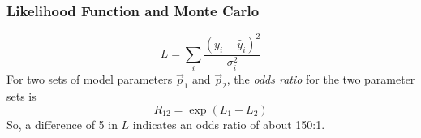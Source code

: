 \documentclass{beamer}
\begin{document}
\begin{frame}
  \frametitle{Likelihood Function and Monte Carlo}
  \begin{equation}
    L = \sum_i \frac{(y_i - \hat{y}_i)^2}{\sigma_i^2}
  \end{equation}
  For two sets of model parameters $\vec{p}_1$ and $\vec{p}_2$, the
  \emph{odds ratio} for the two parameter sets is
  \begin{equation}
    R_{12} = \exp\left(L_1 - L_2\right)
  \end{equation}
  So, a difference of 5 in $L$ indicates an odds ratio of about 150:1.
\end{frame}
\end{document}
